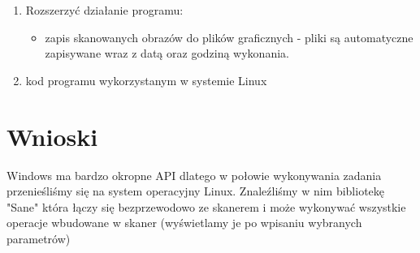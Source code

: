 \documentclass[a4paper,12pt]{extarticle}  %
\begin{document}
\begin{enumerate}
	\item Rozszerzyć działanie programu:
	      \begin{itemize}
		      \item zapis skanowanych obrazów do plików graficznych - pliki są automatyczne zapisywane wraz z datą oraz godziną wykonania.

	      \end{itemize}
	\item kod programu wykorzystanym w systemie Linux
	      

\end{enumerate}
\section{Wnioski}
Windows ma bardzo okropne API dlatego w połowie wykonywania zadania przenieśliśmy się na system operacyjny Linux.
Znaleźliśmy w nim bibliotekę "Sane" która łączy się bezprzewodowo ze skanerem i może wykonywać wszystkie operacje wbudowane w skaner (wyświetlamy je po wpisaniu wybranych parametrów)
\end{document}

